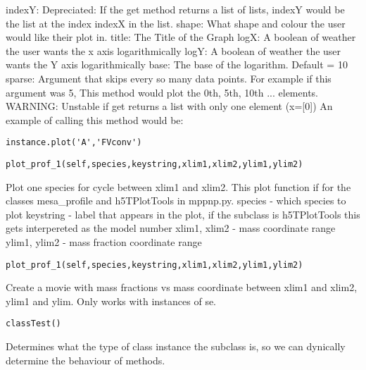 		indexY: Depreciated: If the get method returns a list of lists, indexY
			would be the list at the index indexX in the list.\newline
		shape: What shape and colour the user would like their plot in.
		       \newline
		title: The Title of the Graph \newline
		logX: A boolean of weather the user wants the x axis logarithmically\newline
		logY: A boolean of weather the user wants the Y axis logarithmically\newline
		base: The base of the logarithm. Default = 10\newline
		sparse: Argument that skips every so many data points. For 
			example if this argument was 5, This method would plot
			the 0th, 5th, 10th ... elements.\newline
		WARNING: Unstable if get returns a list with only one element (x=[0])\newline
An example of calling this method would be:
\begin{verbatim}
instance.plot('A','FVconv')
\end{verbatim}

\begin{verbatim}
plot_prof_1(self,species,keystring,xlim1,xlim2,ylim1,ylim2)
\end{verbatim}
Plot one species for cycle between xlim1 and xlim2. This plot function if for the classes mesa\_profile and h5TPlotTools in mppnp.py.\newline		
	species      - which species to plot \newline
	keystring    - label that appears in the plot, if the subclass is h5TPlotTools this gets interpereted as the model number \newline
	xlim1, xlim2 - mass coordinate range\newline                                                 
	ylim1, ylim2 - mass fraction coordinate range\newline\newline

\begin{verbatim}
plot_prof_1(self,species,keystring,xlim1,xlim2,ylim1,ylim2)
\end{verbatim}
Create a movie with mass fractions vs mass coordinate 
		between xlim1 and xlim2, ylim1 and ylim. Only works with instances of se.\newline\newline
\begin{verbatim}
classTest()
\end{verbatim}
Determines what the type of class instance the subclass is, so
		we can dynically determine the behaviour of methods.
		
